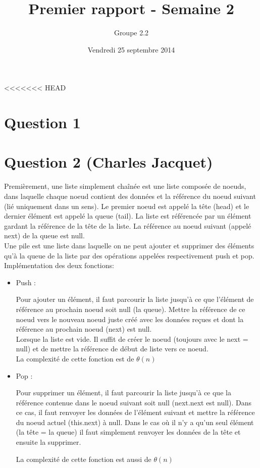 \documentclass[10pt,a4paper]{article}
\date{Vendredi 25 septembre 2014}
\author{Groupe 2.2}
\title{Premier rapport - Semaine 2}
\begin{document}
\maketitle
<<<<<<< HEAD
\section*{Question 1}
\section*{Question 2 (Charles Jacquet)}
Premièrement, une liste simplement chaînée est une liste composée de noeuds, dans laquelle chaque noeud contient des données et la référence du noeud suivant (lié uniquement dans un sens). Le premier noeud est appelé la tête (head) et le dernier élément est appelé la queue (tail). La liste est référencée par un élément gardant la référence de la tête de la liste. La référence au noeud suivant (appelé next) de la queue est null.\\
Une pile est une liste dans laquelle on ne peut ajouter et supprimer des éléments qu'à la queue de la liste par des opérations appelées respectivement push et pop.\\
Implémentation des deux fonctions:
\begin{itemize}
\item {Push :}

Pour ajouter un élément, il faut parcourir la liste jusqu'à ce que l'élément de référence au prochain noeud soit null (la queue). Mettre la référence de ce noeud vers le nouveau noeud juste créé avec les données reçues et dont la référence au prochain noeud (next) est null.\\
Lorsque la liste est vide. Il suffit de créer le noeud (toujours avec le next = null) et de mettre la référence de début de liste vers ce noeud.\\
La complexité de cette fonction est de $\theta (n) $
\item {Pop : }

Pour supprimer un élément, il faut parcourir la liste jusqu'à ce que la référence contenue dans le noeud suivant soit null (next.next est null). Dans ce cas, il faut renvoyer les données de l'élément suivant et mettre la référence du noeud actuel (this.next) à null. 
Dans le cas où il n'y a qu'un seul élément (la tête = la queue) il faut simplement renvoyer les données de la tête et ensuite la supprimer.

La complexité de cette fonction est aussi de $\theta (n) $
\end{itemize}
\end{document}
